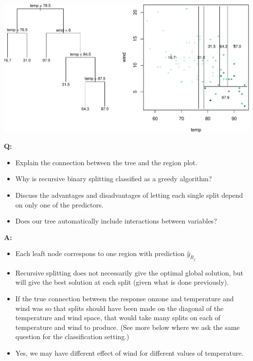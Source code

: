 \documentclass[ignorenonframetext,]{beamer}
\providecommand{\tightlist}{%
  \setlength{\itemsep}{0pt}\setlength{\parskip}{0pt}}
\begin{document}
\begin{frame}

\includegraphics{8TreesBEAMER_files/figure-beamer/unnamed-chunk-9-1.pdf}

\textbf{Q:}

\begin{itemize}
\tightlist
\item
  Explain the connection between the tree and the region plot.
\item
  Why is recursive binary splitting classified as a greedy algorithm?
\item
  Discuss the advantages and disadvantages of letting each single split
  depend on only one of the predictors.
\item
  Does our tree automatically include interactions between variables?
\end{itemize}

\end{frame}

\begin{frame}

\textbf{A:}

\begin{itemize}
\tightlist
\item
  Each leaft node correspons to one region with prediction
  \(\hat{y}_{R_j}\)
\item
  Recursive splitting does not necessarily give the optimal global
  solution, but will give the best solution at each split (given what is
  done previously).
\item
  If the true connection between the response onzone and temperature and
  wind was so that splits should have been made on the diagonal of the
  temperature and wind space, that would take many splits on each of
  temperature and wind to produce. (See more below where we ask the same
  question for the classification setting.)
\item
  Yes, we may have different effect of wind for different values of
  temperature.
\end{itemize}

\end{frame}
\end{document}
